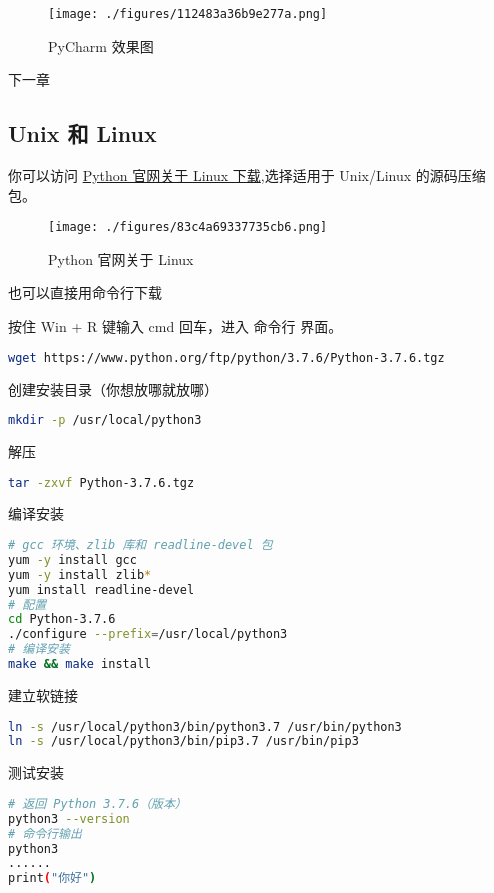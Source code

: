 \begin{figure}[ht]
\centering
\texttt{[image: ./figures/112483a36b9e277a.png]}
\caption{PyCharm 效果图} \label{fig_Pyc1_2}
\end{figure}

下一章 

\subsection{Unix 和 Linux}\label{sub_Pyc1_3} 

你可以访问 \href{https://www.python.org/downloads/source/}{Python 官网关于 Linux 下载},选择适用于 Unix/Linux 的源码压缩包。
\begin{figure}[ht]
\centering
\texttt{[image: ./figures/83c4a69337735cb6.png]}
\caption{Python 官网关于 Linux} \label{fig_Python_2}
\end{figure}

也可以直接用命令行下载

按住 Win + R 键输入 cmd 回车，进入 命令行 界面。

\begin{lstlisting}[language=bash]
wget https://www.python.org/ftp/python/3.7.6/Python-3.7.6.tgz
\end{lstlisting}

创建安装目录（你想放哪就放哪）
\begin{lstlisting}[language=bash]
mkdir -p /usr/local/python3
\end{lstlisting}

解压
\begin{lstlisting}[language=bash]
tar -zxvf Python-3.7.6.tgz
\end{lstlisting}

编译安装
\begin{lstlisting}[language=bash]
# gcc 环境、zlib 库和 readline-devel 包
yum -y install gcc
yum -y install zlib*
yum install readline-devel
# 配置
cd Python-3.7.6
./configure --prefix=/usr/local/python3
# 编译安装
make && make install
\end{lstlisting}

建立软链接
\begin{lstlisting}[language=bash]
ln -s /usr/local/python3/bin/python3.7 /usr/bin/python3
ln -s /usr/local/python3/bin/pip3.7 /usr/bin/pip3
\end{lstlisting}

测试安装
\begin{lstlisting}[language=bash]
# 返回 Python 3.7.6（版本）
python3 --version
# 命令行输出
python3
......
print("你好")
\end{lstlisting}

